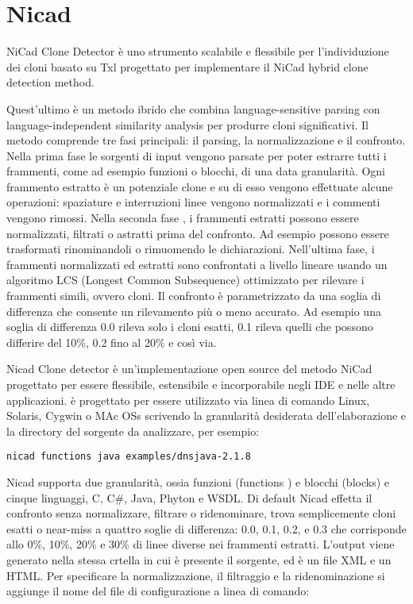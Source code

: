 \section{Nicad}
NiCad Clone Detector è uno strumento scalabile e flessibile per l'individuzione dei cloni basato su Txl progettato per implementare il NiCad hybrid clone detection method.

Quest'ultimo è un metodo ibrido che combina language-sensitive parsing con language-independent similarity analysis per produrre cloni significativi.
Il metodo comprende tre fasi principali: il parsing, la normalizzazione e il confronto.
Nella prima fase le sorgenti di input vengono parsate per poter estrarre tutti i frammenti, come ad esempio funzioni o blocchi, di una data granularità. Ogni frammento estratto è un potenziale clone e su di esso vengono effettuate alcune operazioni: spaziature e interruzioni linee vengono normalizzati e i commenti vengono rimossi. 
Nella seconda fase , i frammenti estratti possono essere normalizzati, filtrati o astratti prima del confronto. Ad esempio possono essere trasformati rinominandoli o rimuomendo le dichiarazioni.
Nell'ultima fase, i frammenti normalizzati ed estratti sono confrontati a livello lineare usando un algoritmo LCS (Longest Common Subsequence) ottimizzato per rilevare i frammenti simili, ovvero cloni. Il confronto è parametrizzato da una soglia di differenza che consente un rilevamento più o meno accurato. Ad esempio una soglia di differenza 0.0 rileva solo i cloni esatti, 0.1 rileva quelli che possono differire del 10\%, 0.2 fino al 20\% e così via.

Nicad Clone detector è un'implementazione open source del metodo NiCad progettato per essere flessibile, estensibile e incorporabile negli IDE e nelle altre applicazioni. è progettato per essere utilizzato via linea di comando Linux, Solaris, Cygwin o MAc OSs scrivendo la granularità desiderata dell'elaborazione e la directory del sorgente da analizzare, per esempio: 

\begin{center}
\verb|nicad functions java examples/dnsjava-2.1.8|
\end{center}

Nicad supporta due granularità, ossia funzioni (functions ) e blocchi (blocks) e cinque linguaggi, C, C\#, Java, Phyton e WSDL.
Di default Nicad effetta il confronto senza normalizzare, filtrare o ridenominare, trova semplicemente cloni esatti o near-miss a quattro soglie di differenza: 0.0, 0.1, 0.2, e 0.3 che corrisponde allo 0\%, 10\%, 20\% e 30\% di linee diverse nei frammenti estratti.
L'output viene generato nella stessa crtella in cui è presente il sorgente, ed è un file XML e un HTML.
Per specificare la normalizzazione, il filtraggio e la ridenominazione si aggiunge il nome del file di configurazione a linea di comando:

